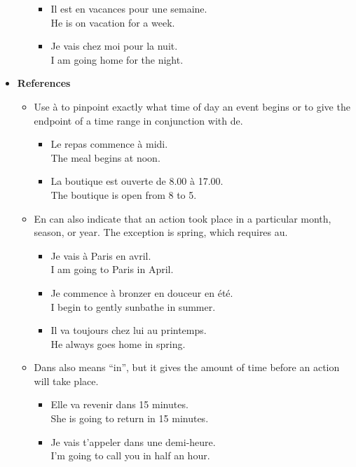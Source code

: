 \begin{itemize}
\begin{itemize}
        \begin{itemize}
          \item  Il est en vacances pour une semaine. \\ He is on vacation for a week.
          \item  Je vais chez moi pour la nuit. \\ I am going home for the night.
        \end{itemize}
    \end{itemize}
  \item  \textbf{References}
    \begin{itemize}
      \item  Use {\`a} to pinpoint exactly what time of day an event begins or to give the endpoint of a time range in conjunction with de.
        \begin{itemize}
          \item  Le repas commence {\`a} midi. \\ The meal begins at noon.
          \item  La boutique est ouverte de 8.00 {\`a} 17.00. \\ The boutique is open from 8 to 5.
        \end{itemize}
      \item  En can also indicate that an action took place in a particular month, season, or year. The exception is spring, which requires au.
        \begin{itemize}
          \item  Je vais {\`a} Paris en avril. \\ I am going to Paris in April. 
          \item  Je commence {\`a} bronzer en douceur en {\'e}t{\'e}. \\ I begin to gently sunbathe in summer.
          \item  Il va toujours chez lui au printemps. \\ He always goes home in spring.
        \end{itemize}
      \item  Dans also means ``in'', but it gives the amount of time before an action will take place.
        \begin{itemize}
          \item  Elle va revenir dans 15 minutes. \\ She is going to return in 15 minutes.
          \item  Je vais t'appeler dans une demi-heure. \\ I'm going to call you in half an hour.

\end{itemize}
\end{itemize}
\end{itemize}

